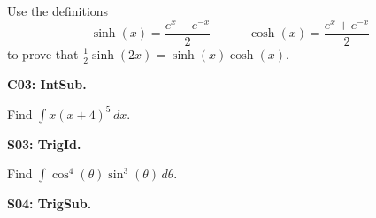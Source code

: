 \documentclass[12pt]{article}
\newcommand{\<}{\left\langle}
\renewcommand{\>}{\right\rangle}
\newcommand{\exerciseHeader}[4]{


  \vspace{0.5em}
  \textbf{#2}
  \vspace{0.5em}

}
\begin{document}
\begin{multicols}{2}
Use the definitions
\[
  \sinh(x)=\frac{e^x-e^{-x}}{2}
    \hspace{3em}
  \cosh(x)=\frac{e^x+e^{-x}}{2}
\]
to prove that \(\frac{1}{2}\sinh(2x)=\sinh(x)\cosh(x)\).



%

%

%

%

\exerciseHeader{2017 June 14}{C03: IntSub.}{
Use integration by substitution.
}{4/4}

Find \(\int x(x+4)^5\,dx\).



%

%

%

\exerciseHeader{2017 June 14}{S03: TrigId.}{
Integrate products of trigonometric functions by applying trigonometric
identities.
}{3/3}

Find \(\int\cos^4(\theta)\sin^3(\theta)\,d\theta\).



%

%
%
%
%
\exerciseHeader{2017 June 15}{S04: TrigSub.}{
Use trigonometric substitution.
}{3/3}


\end{multicols}
\end{document}
